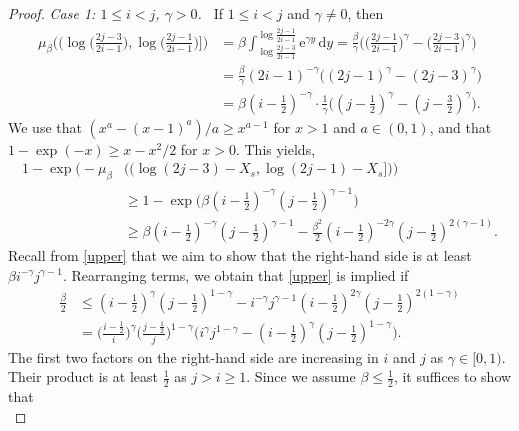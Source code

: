 \documentclass[a4paper, a4wide, 10pt, reqno]{amsart}
\theoremstyle{plain}
\theoremstyle{definition}
\numberwithin{equation}{section}
\newcommand{\re}{{\mathrm e}}
\newcommand{\rd}{\mathrm{d}}
\begin{document}
\begin{proof}
    \smallskip 
    \noindent\emph{Case 1: $1\le i<j$, $\gamma>0$.\ }
	If $1\le i<j$ and $\gamma\neq 0$, then 
	\begin{align}
		\mu_\beta \Big( (\log \big(\tfrac{2j-3}{2i-1}\big), \log \big(\tfrac{2j-1}{2i-1}\big) \big]\Big)
		 & = \beta \int_{\log \frac{2j-3}{2i-1}}^{\log \frac{2j-1}{2i-1}}
		\re^{\gamma y} \, \rd y
		= \tfrac\beta\gamma \Big(\big(\tfrac{2j-1}{2i-1}\big)^\gamma-\big(\tfrac{2j-3}{2i-1}\big)^\gamma \Big)                                                \label{upper-int} \\
		 & =\tfrac\beta\gamma  (2i-1)^{-\gamma}\Big((2j-1)^\gamma-(2j-3)^{\gamma}\Big) \nonumber\\&= \beta(i-\tfrac12 )^{-\gamma}\cdot\tfrac{1}{\gamma}\Big((j-\tfrac12 )^\gamma-(j-\tfrac32)^{\gamma}\Big).\nonumber
	\end{align}
    We use that $(x^a-(x-1)^a)/a\ge x^{a-1}$ for $x>1$ and $a\in(0,1)$, and that $1-\exp(-x)\ge x-x^2/2$ for $x>0$. This yields,
    \begin{align}
    1-\exp\Big(-\mu_\beta
		&\big( (\log (2j-3) -X_{s}, \log(2j-1) -X_{s}]\big)\Big)\nonumber\\
        &\ge
        1-\exp\Big(\beta(i-\tfrac12 )^{-\gamma}(j-\tfrac12 )^{\gamma-1}\Big) \label{eq:upper-12}\\
        &\ge \beta(i-\tfrac12 )^{-\gamma}(j-\tfrac12 )^{\gamma-1} - \tfrac{\beta^2}{2}(i-\tfrac12 )^{-2\gamma}(j-\tfrac12 )^{2(\gamma-1)}.\nonumber
        \end{align}
    Recall from \eqref{upper} that we aim to show that the right-hand side is at least $\beta i^{-\gamma}j^{\gamma-1}$. Rearranging terms, we obtain that \eqref{upper} is implied if 
    \begin{equation}\nonumber
    \begin{aligned}
    \tfrac{\beta}{2}&\le (i-\tfrac12 )^{\gamma}(j-\tfrac12 )^{1-\gamma}-i^{-\gamma}j^{\gamma-1}(i-\tfrac12 )^{2\gamma}(j-\tfrac12 )^{2(1-\gamma)} \\
    &= \big(\tfrac{i-\frac12 }{i}\big)^{\gamma}\big(\tfrac{j-\frac12 }{j}\big)^{1-\gamma}\Big(i^\gamma j^{1-\gamma} - (i-\tfrac12 )^{\gamma}(j-\tfrac12 )^{1-\gamma}\Big).
    \end{aligned}
    \end{equation}
    The first two factors on the right-hand side are increasing in $i$ and $j$ as $\gamma\in[0,1)$. Their product is at least $\tfrac12 $ as $j>i\ge 1$. Since we assume $\beta\le \tfrac12 $, it suffices to show that 
    \begin{equation}\label{eq:1ijgamma}

\end{equation}
\end{proof}
\end{document}
